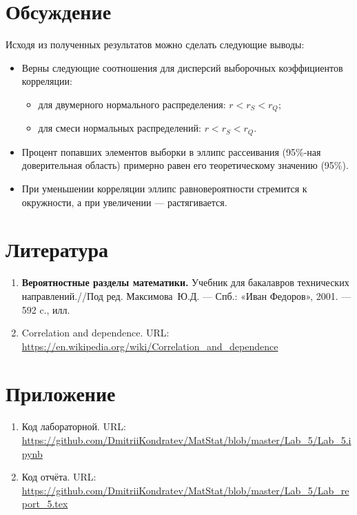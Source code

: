 \documentclass[12pt,a4paper]{article}
\begin{document}
	\newpage
	\section{Обсуждение}
	Исходя из полученных результатов можно сделать следующие выводы:
	\begin{itemize}
		\item Верны следующие соотношения для дисперсий выборочных коэффициентов корреляции:
		\begin{itemize}
			\item для двумерного нормального распределения: $r < r_S < r_Q$;
			
			\item для смеси нормальных распределений: $r < r_S < r_Q$.
		\end{itemize}
	
		\item Процент попавших элементов выборки в эллипс рассеивания (95\%-ная доверительная область) примерно равен его теоретическому значению (95\%).
		
		\item При уменьшении корреляции эллипс равновероятности стремится к окружности, а при увеличении --- растягивается.
	\end{itemize}
	
	\section{Литература}
	\begin{enumerate}
		\item \label{Book_1} \textbf{Вероятностные разделы математики.} Учебник для бакалавров технических направлений.//Под ред. Максимова~Ю.Д. --- Спб.: «Иван Федоров», 2001. --- 592 c., илл.
		
		\item Correlation and dependence. URL: \url{https://en.wikipedia.org/wiki/Correlation_and_dependence}
	\end{enumerate}

	\section{Приложение}
	\begin{enumerate}
		\item Код лабораторной. URL: \url{https://github.com/DmitriiKondratev/MatStat/blob/master/Lab_5/Lab_5.ipynb}
		
		\item Код отчёта. URL: \url{https://github.com/DmitriiKondratev/MatStat/blob/master/Lab_5/Lab_report_5.tex}
		
	\end{enumerate}
\end{document}
